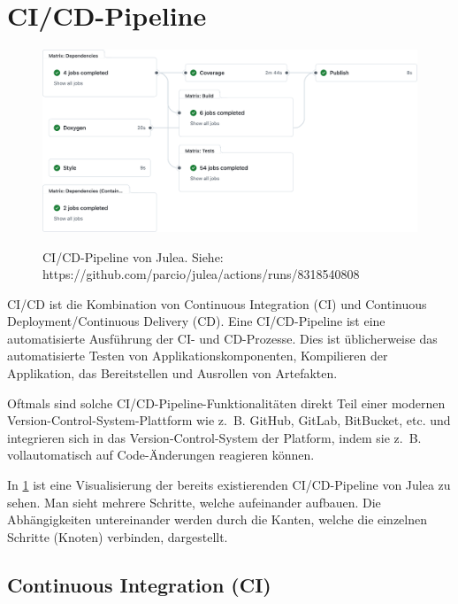 \section{CI/CD-Pipeline} \label{sec:ci-cd-pipeline}

\begin{figure}[H]
    \includegraphics[width=\textwidth]{./figures/ci-julea-exmaple-full.png}
    \label{fig:ci-cd-julea-example-full}
    \caption{CI/CD-Pipeline von Julea. \newline
        Siehe: https://github.com/parcio/julea/actions/runs/8318540808}
\end{figure}

CI/CD ist die Kombination von Continuous Integration (CI) und Continuous Deployment/Continuous Delivery (CD). Eine CI/CD-Pipeline ist eine automatisierte Ausführung der CI- und CD-Prozesse. Dies ist üblicherweise das automatisierte Testen von Applikationskomponenten, Kompilieren der Applikation, das Bereitstellen und Ausrollen von Artefakten. 

Oftmals sind solche CI/CD-Pipeline-Funktionalitäten direkt Teil einer modernen Version-Control-System-Plattform wie z. B. GitHub, GitLab, BitBucket, etc. und integrieren sich in das Version-Control-System der Platform, indem sie z. B. vollautomatisch auf Code-Änderungen reagieren können. 

In \cref{fig:ci-cd-julea-example-full} ist eine Visualisierung der bereits existierenden CI/CD-Pipeline von Julea zu sehen. Man sieht mehrere Schritte, welche aufeinander aufbauen. Die Abhängigkeiten untereinander werden durch die Kanten, welche die einzelnen Schritte (Knoten) verbinden, dargestellt.


\pagebreak

\subsection{Continuous Integration (CI)}

